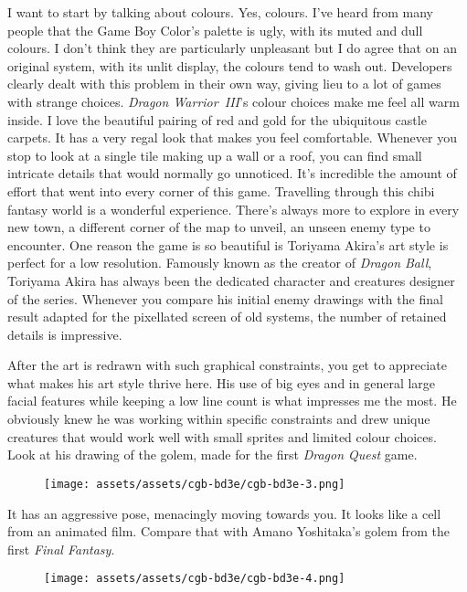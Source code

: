 \documentclass{book}
\begin{document}
I want to start by talking about colours. Yes, colours. I’ve heard from many people that the Game Boy Color’s palette is ugly, with its muted and dull colours. I don’t think they are particularly unpleasant but I do agree that on an original system, with its unlit display, the colours tend to wash out. Developers clearly dealt with this problem in their own way, giving lieu to a lot of games with strange choices. \emph{Dragon Warrior III}’s colour choices make me feel all warm inside. I love the beautiful pairing of red and gold for the ubiquitous castle carpets. It has a very regal look that makes you feel comfortable. Whenever you stop to look at a single tile making up a wall or a roof, you can find small intricate details that would normally go unnoticed. It’s incredible the amount of effort that went into every corner of this game. Travelling through this chibi fantasy world is a wonderful experience. There’s always more to explore in every new town, a different corner of the map to unveil, an unseen enemy type to encounter. One reason the game is so beautiful is Toriyama Akira’s art style is perfect for a low resolution. Famously known as the creator of \emph{Dragon Ball}, Toriyama Akira has always been the dedicated character and creatures designer of the series. Whenever you compare his initial enemy drawings with the final result adapted for the pixellated screen of old systems, the number of retained details is impressive.

After the art is redrawn with such graphical constraints, you get to appreciate what makes his art style thrive here. His use of big eyes and in general large facial features while keeping a low line count is what impresses me the most. He obviously knew he was working within specific constraints and drew unique creatures that would work well with small sprites and limited colour choices. Look at his drawing of the golem, made for the first \emph{Dragon Quest} game.

\begin{figure}[hbt]
\vskip 10pt
\centering \texttt{[image: assets/assets/cgb-bd3e/cgb-bd3e-3.png]}
\vskip 6pt
\end{figure}

It has an aggressive pose, menacingly moving towards you. It looks like a cell from an animated film. Compare that with Amano Yoshitaka’s golem from the first \emph{Final Fantasy}.

\begin{figure}[hbt]
\vskip 10pt
\centering \texttt{[image: assets/assets/cgb-bd3e/cgb-bd3e-4.png]}
\vskip 6pt
\end{figure}
\end{document}
